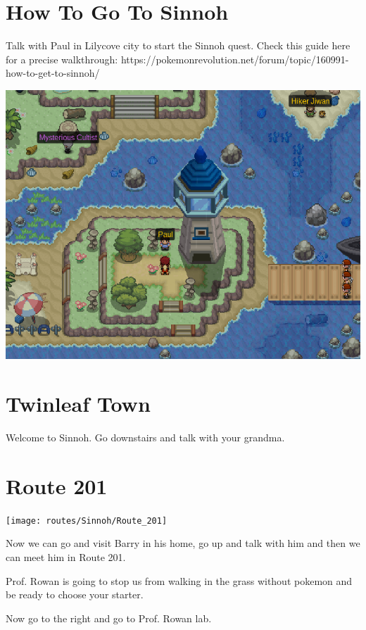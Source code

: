 \documentclass[11pt]{article}
\begin{document}
\section{How To Go To Sinnoh}\label{sec:how-to-go-to-sinnoh}
Talk with Paul in Lilycove city to start the Sinnoh quest.
Check this guide here for a precise walkthrough:
https://pokemonrevolution.net/forum/topic/160991-how-to-get-to-sinnoh/

\includegraphics[width=\textwidth]{walkthrough/Sinnoh/paul-lilycove}

\section{Twinleaf Town}\label{sec:twinleaf-town}
Welcome to Sinnoh.
Go downstairs and talk with your grandma.

\section{Route 201}\label{sec:Route_201}
\texttt{[image: routes/Sinnoh/Route\_201]}

Now we can go and visit Barry in his home, go up and talk with him
and then we can meet him in Route 201.

Prof. Rowan is going to stop us from walking in the grass without pokemon
and be ready to choose your starter.

Now go to the right and go to Prof. Rowan lab.


\end{document}
